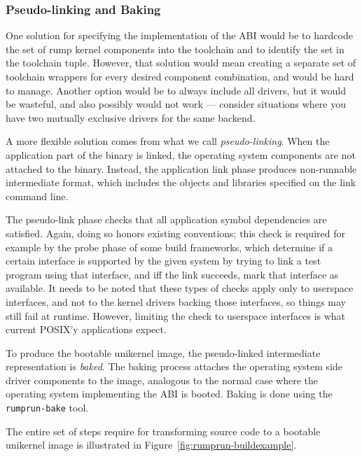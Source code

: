\subsubsection*{Pseudo-linking and Baking}

One solution for specifying the implementation of the ABI would be to hardcode
the set of rump kernel components into the toolchain and to identify the
set in the toolchain tuple.
However, that solution would mean creating a separate set of toolchain wrappers
for every desired component combination, and would be hard to manage.
Another option would be to always include all drivers, but it would be
wasteful, and also possibly would not work --- consider situations where
you have two mutually exclusive drivers for the same backend.

A more flexible solution comes from what we call \textit{pseudo-linking}.  When the
application part of the binary is linked, the operating system components
are not attached to the binary.  Instead, the application link phase
produces non-runnable intermediate format, which includes the objects
and libraries specified on the link command line.

The pseudo-link phase checks that all application symbol
dependencies are satisfied.  Again, doing so honors existing
conventions; this check is required for example by the
probe phase of some build frameworks, which determine if a certain
interface is supported by the given system by trying to link a test
program using that interface, and iff the link succeeds, mark that
interface as available.  It needs to be noted that these types of checks
apply only to userspace interfaces, and not to the kernel drivers backing
those interfaces, so things may still fail at runtime.  However,
limiting the check to userspace interfaces is what current POSIX'y
applications expect.

To produce the bootable unikernel image, the pseudo-linked intermediate
representation is \textit{baked}.  The baking process attaches the
operating system side driver components to the image, analogous to
the normal case where the operating system implementing the ABI is
booted.  Baking is done using the \verb+rumprun-bake+ tool.

The entire set of steps require for transforming source code to a bootable
unikernel image is illustrated in Figure~\ref{fig:rumprun-buildexample}.


